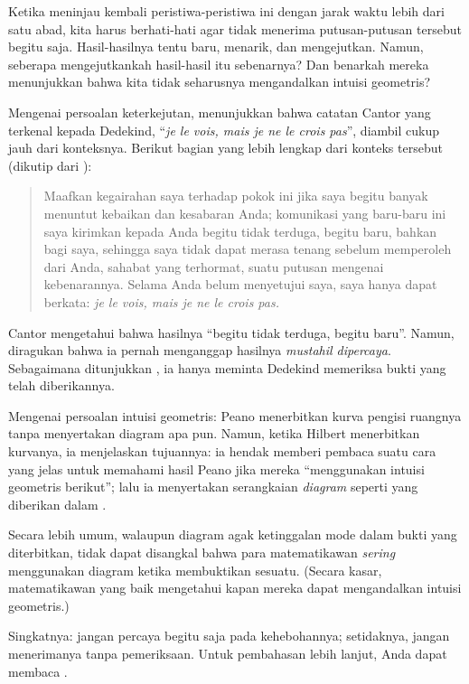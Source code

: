 \documentclass[../../../include/open-logic-section]{subfiles}
\begin{document}


Ketika meninjau kembali peristiwa-peristiwa ini dengan jarak waktu lebih dari
satu abad, kita harus berhati-hati agar tidak menerima putusan-putusan
tersebut begitu saja. Hasil-hasilnya tentu baru, menarik, dan mengejutkan.
Namun, seberapa mengejutkankah hasil-hasil itu sebenarnya? Dan benarkah
mereka menunjukkan bahwa kita tidak seharusnya mengandalkan intuisi
geometris?

Mengenai persoalan keterkejutan, \citet{Gouvea2011} menunjukkan bahwa catatan
Cantor yang terkenal kepada Dedekind,
``\emph{je le vois, mais je ne le crois pas}'', diambil cukup jauh dari
konteksnya. Berikut bagian yang lebih lengkap dari konteks tersebut (dikutip
dari \citeauthor{Gouvea2011}):
\begin{quote}
Maafkan kegairahan saya terhadap pokok ini jika saya begitu banyak menuntut
kebaikan dan kesabaran Anda; komunikasi yang baru-baru ini saya kirimkan
kepada Anda begitu tidak terduga, begitu baru, bahkan bagi saya, sehingga
saya tidak dapat merasa tenang sebelum memperoleh dari Anda, sahabat yang
terhormat, suatu putusan mengenai kebenarannya. Selama Anda belum menyetujui
saya, saya hanya dapat berkata:
\emph{je le vois, mais je ne le crois pas.}
\end{quote}
Cantor mengetahui bahwa hasilnya ``begitu tidak terduga, begitu baru''.
Namun, diragukan bahwa ia pernah menganggap hasilnya \emph{mustahil
dipercaya}. Sebagaimana ditunjukkan \citeauthor{Gouvea2011}, ia hanya meminta
Dedekind memeriksa bukti yang telah diberikannya.

Mengenai persoalan intuisi geometris: Peano menerbitkan kurva pengisi
ruangnya tanpa menyertakan diagram apa pun. Namun, ketika Hilbert menerbitkan
kurvanya, ia menjelaskan tujuannya: ia hendak memberi pembaca suatu cara yang
jelas untuk memahami hasil Peano jika mereka ``menggunakan intuisi
geometris berikut''; lalu ia menyertakan serangkaian \emph{diagram} seperti
yang diberikan dalam .

Secara lebih umum, walaupun diagram agak ketinggalan mode dalam bukti yang
diterbitkan, tidak dapat disangkal bahwa para matematikawan \emph{sering}
menggunakan diagram ketika membuktikan sesuatu. (Secara kasar, matematikawan
yang baik mengetahui kapan mereka dapat mengandalkan intuisi geometris.)

Singkatnya: jangan percaya begitu saja pada kehebohannya; setidaknya, jangan
menerimanya tanpa pemeriksaan. Untuk pembahasan lebih lanjut, Anda dapat
membaca \citet{Giaquinto2007}.
\end{document}
